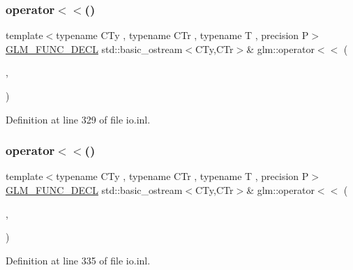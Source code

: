 \subsubsection{\texorpdfstring{operator$<$$<$()}{operator<<()}\hspace{0.1cm}{\footnotesize\ttfamily [8/15]}}
{\footnotesize\ttfamily template$<$typename C\+Ty , typename C\+Tr , typename T , precision P$>$ \\
\mbox{\hyperlink{setup_8hpp_ab2d052de21a70539923e9bcbf6e83a51}{G\+L\+M\+\_\+\+F\+U\+N\+C\+\_\+\+D\+E\+CL}} std\+::basic\+\_\+ostream$<$C\+Ty,C\+Tr$>$\& glm\+::operator$<$$<$ (\begin{DoxyParamCaption}\item[{std\+::basic\+\_\+ostream$<$ C\+Ty, C\+Tr $>$ \&}]{,  }\item[{\mbox{\hyperlink{structglm_1_1tmat2x4}{tmat2x4}}$<$ T, P $>$ const \&}]{ }\end{DoxyParamCaption})}



Definition at line 329 of file io.\+inl.

\mbox{\label{group__gtx__io_gac825ec168ada9209dad314bca460ceef}} 
\subsubsection{\texorpdfstring{operator$<$$<$()}{operator<<()}\hspace{0.1cm}{\footnotesize\ttfamily [9/15]}}
{\footnotesize\ttfamily template$<$typename C\+Ty , typename C\+Tr , typename T , precision P$>$ \\
\mbox{\hyperlink{setup_8hpp_ab2d052de21a70539923e9bcbf6e83a51}{G\+L\+M\+\_\+\+F\+U\+N\+C\+\_\+\+D\+E\+CL}} std\+::basic\+\_\+ostream$<$C\+Ty,C\+Tr$>$\& glm\+::operator$<$$<$ (\begin{DoxyParamCaption}\item[{std\+::basic\+\_\+ostream$<$ C\+Ty, C\+Tr $>$ \&}]{,  }\item[{\mbox{\hyperlink{structglm_1_1tmat3x2}{tmat3x2}}$<$ T, P $>$ const \&}]{ }\end{DoxyParamCaption})}



Definition at line 335 of file io.\+inl.

\mbox{\label{group__gtx__io_ga3ea3ca90bea2e763079f09af1e5d50ab}} 
